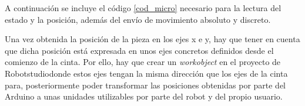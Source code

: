 A continuación se incluye el código \ref{cod_micro} necesario para la lectura del estado y la posición, además del envío
de movimiento absoluto y discreto.



Una vez obtenida la posición de la pieza en los ejes x e y, hay que tener en cuenta que dicha posición
está expresada en unos ejes concretos definidos desde el comienzo de la cinta. Por ello, hay que crear 
un \emph{workobject} en el proyecto de Robotstudiodonde estos ejes tengan la misma dirección que los ejes
de la cinta para, posteriormente poder transformar las posiciones obtenidas por parte del Arduino 
a unas unidades utilizables por parte del robot y del propio usuario.